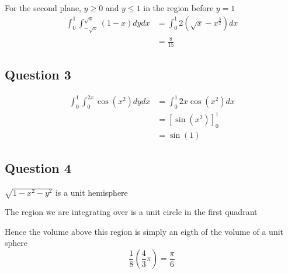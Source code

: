 \documentclass{article}
\begin{document}
For the second plane, \(y \geq 0\) and \(y \leq 1\) in the region before \(y = 1\)
\begin{align*}
    \int_{0}^{1} \int_{-\sqrt{x}}^{\sqrt{x}} (1-x) dy dx &= \int_{0}^{1} 2(\sqrt{x} - x^{\frac{3}{2}}) dx \\
    &= \frac{8}{15}
\end{align*}

\subsection*{Question 3}
\begin{align*}
    \int_{0}^{1} \int_{0}^{2x} \cos(x^2) dy dx &= \int_{0}^{1} 2x \cos(x^2) dx \\
    &= \left[\sin(x^2)\right]_0^1 \\
    &= \sin(1)
\end{align*}

\subsection*{Question 4}
\(\sqrt{1-x^2 - y^2}\) is a unit hemisphere

The region we are integrating over is a unit circle in the first quadrant

Hence the volume above this region is simply an eigth of the volume of a unit sphere
\[
\frac{1}{8}\left(\frac{4}{3}\pi\right) = \frac{\pi}{6}
\]
\end{document}

